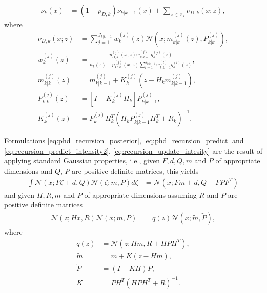 \begin{align}
    \nu_{k}(x) &= (1-p_{D,k}) \nu_{k|k-1}(x) + \sum_{z\in Z_k}\nu_{D,k}(x;z), \label{eq:recursion_update_intesity}
\end{align}
where
\begin{align}
    \nu_{D,k}(x;z) &= \sum_{j=1}^{J_{k|k-1}} w_k^{(j)}(z) \mathcal{N}(x;m_{k|k}^{(j)}(z),P_{k|k}^{(j)}), \label{eq:recursion_update_intesity_detect} \\
    w_k^{(j)}(z) &= \frac{p_{D,k}^{(j)}(x;z) w_{k|k-1}^{(j)} q_k^{(j)}(z) }{\kappa_k(z) + p_{D,k}^{(j)}(x;z) \sum_{l=1}^{J_{k|k-1}} w_{k|k-1}^{(l)} q_k^{(l)}(z)}, \label{eq:recursion_update_intesity_detect_w} \\
    m_{k|k}^{(j)}(z) &= m_{k|k-1}^{(j)} + K_k^{(j)}(z-H_k m_{k|k-1}^{(j)}), \label{eq:recursion_update_intesity_detect_m} \\
    P_{k|k}^{(j)}(z) &= [I - K_k^{(j)} H_k] P_{k|k-1}^{(j)},  \label{eq:recursion_update_intesity_detect_P} \\
    K_{k}^{(j)}(z) &= P_{k}^{(j)} H_k^T(H_k P_{k|k-1}^{(j)} H_k^T + R_k)^{-1}. \label{eq:recursion_update_intesity_detect_K}
\end{align}

Formulations \eqref{eq:phd_recursion_posterior}, \eqref{eq:phd_recursion_predict} and \eqref{eq:recursion_predict_intensity2}, \eqref{eq:recursion_update_intesity} are the result of applying standard Gaussian properties, i.e., given $F, d, Q, m$ and $P$ of appropriate dimensions and $Q$, $P$ are positive definite matrices, this yields
\begin{align}
    \int \mathcal{N}(x; F\zeta + d, Q) \mathcal{N}(\zeta; m, P) d\zeta &= \mathcal{N}(x; Fm + d, Q + FPF^T) \label{eq:phd_integral_Gaussian}
\end{align}
and given $H, R, m$ and $P$ of appropriate dimensions assuming $R$ and $P$ are positive definite matrices
\begin{align}
    \mathcal{N}(z; Hx, R) \mathcal{N}(x;m,P) &= q(z)\mathcal{N}(x; \tilde{m}, \tilde{P}), \label{eq:phd_integral_Gaussian_measurement}
\end{align}
where
\begin{align}
    q(z) &= \mathcal{N}(z; Hm, R + HPH^T), \\
    \tilde{m} &= m + K(z - Hm), \\
    \tilde{P} &= (I - KH)P, \\
    K &= PH^T(HPH^T + R)^{-1}.
\end{align}


